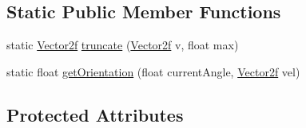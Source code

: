\subsection*{Static Public Member Functions}
\begin{DoxyCompactItemize}
\item 
static \mbox{\hyperlink{class_vector2f}{Vector2f}} \mbox{\hyperlink{class_a_i_a41df20650ec22657d745f565120d3578}{truncate}} (\mbox{\hyperlink{class_vector2f}{Vector2f}} v, float max)
\item 
static float \mbox{\hyperlink{class_a_i_a1811108f5cf63c3735bd68064c59fd45}{get\+Orientation}} (float current\+Angle, \mbox{\hyperlink{class_vector2f}{Vector2f}} vel)
\end{DoxyCompactItemize}
\subsection*{Protected Attributes}
